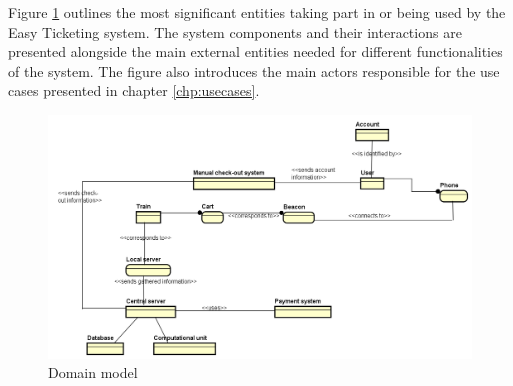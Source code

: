 Figure \ref{fig:domain_model} outlines the most significant entities taking part in or being used by the Easy Ticketing system. The system components and their interactions are presented alongside the main external entities needed for different functionalities of the system. The figure also introduces the main actors responsible for the use cases presented in chapter \ref{chp:usecases}.

\begin{figure}[H]
	\centering
	\includegraphics[width=\textwidth]{Pictures/domain_model.png}
	\caption{Domain model}
	\label{fig:domain_model}
\end{figure}